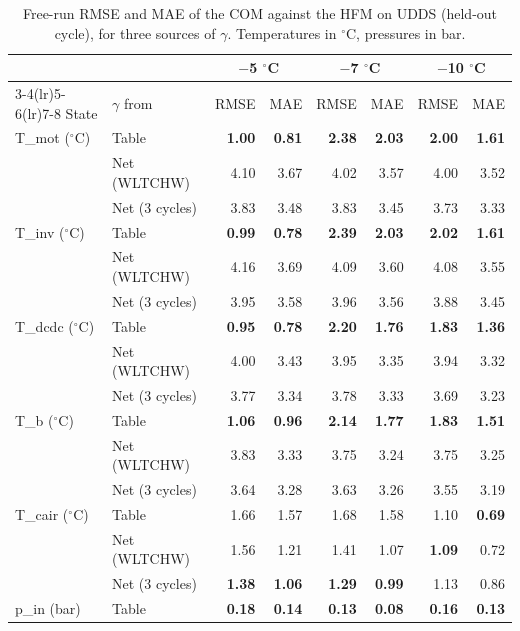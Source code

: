 \begin{table}[t]
\centering
\caption{Free-run RMSE and MAE of the COM against the HFM on UDDS (held-out cycle), for three sources of $\gamma$. Temperatures in $^\circ$C, pressures in bar.}
\label{tab:freerun_udds}
\small
\begin{tabular}{llrrrrrr}
\toprule
 & & \multicolumn{2}{c}{$-$5 $^\circ$C} & \multicolumn{2}{c}{$-$7 $^\circ$C} & \multicolumn{2}{c}{$-$10 $^\circ$C} \\
\cmidrule(lr){3-4}\cmidrule(lr){5-6}\cmidrule(lr){7-8}
State & $\gamma$ from & RMSE & MAE & RMSE & MAE & RMSE & MAE \\
\midrule
T\_mot ($^\circ$C) & Table & \textbf{1.00} & \textbf{0.81} & \textbf{2.38} & \textbf{2.03} & \textbf{2.00} & \textbf{1.61} \\
 & Net (WLTCHW) & 4.10 & 3.67 & 4.02 & 3.57 & 4.00 & 3.52 \\
 & Net (3 cycles) & 3.83 & 3.48 & 3.83 & 3.45 & 3.73 & 3.33 \\
\addlinespace
T\_inv ($^\circ$C) & Table & \textbf{0.99} & \textbf{0.78} & \textbf{2.39} & \textbf{2.03} & \textbf{2.02} & \textbf{1.61} \\
 & Net (WLTCHW) & 4.16 & 3.69 & 4.09 & 3.60 & 4.08 & 3.55 \\
 & Net (3 cycles) & 3.95 & 3.58 & 3.96 & 3.56 & 3.88 & 3.45 \\
\addlinespace
T\_dcdc ($^\circ$C) & Table & \textbf{0.95} & \textbf{0.78} & \textbf{2.20} & \textbf{1.76} & \textbf{1.83} & \textbf{1.36} \\
 & Net (WLTCHW) & 4.00 & 3.43 & 3.95 & 3.35 & 3.94 & 3.32 \\
 & Net (3 cycles) & 3.77 & 3.34 & 3.78 & 3.33 & 3.69 & 3.23 \\
\addlinespace
T\_b ($^\circ$C) & Table & \textbf{1.06} & \textbf{0.96} & \textbf{2.14} & \textbf{1.77} & \textbf{1.83} & \textbf{1.51} \\
 & Net (WLTCHW) & 3.83 & 3.33 & 3.75 & 3.24 & 3.75 & 3.25 \\
 & Net (3 cycles) & 3.64 & 3.28 & 3.63 & 3.26 & 3.55 & 3.19 \\
\addlinespace
T\_cair ($^\circ$C) & Table & 1.66 & 1.57 & 1.68 & 1.58 & 1.10 & \textbf{0.69} \\
 & Net (WLTCHW) & 1.56 & 1.21 & 1.41 & 1.07 & \textbf{1.09} & 0.72 \\
 & Net (3 cycles) & \textbf{1.38} & \textbf{1.06} & \textbf{1.29} & \textbf{0.99} & 1.13 & 0.86 \\
\addlinespace
p\_in (bar) & Table & \textbf{0.18} & \textbf{0.14} & \textbf{0.13} & \textbf{0.08} & \textbf{0.16} & \textbf{0.13} \\

\end{tabular}
\end{table}
